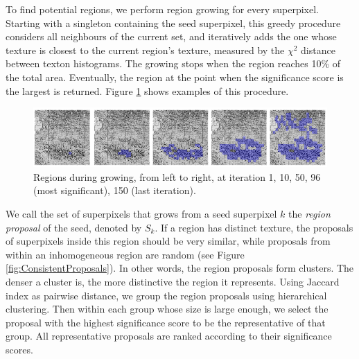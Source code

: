 \documentclass{llncs}
\begin{document}
To find potential regions, we perform region growing for every superpixel. Starting with a singleton containing the seed superpixel, this greedy procedure considers all neighbours of the current set, and iteratively adds the one whose texture is closest to the current region's texture, measured by the $\chi^2$ distance between texton histograms. The growing stops when the region reaches 10\% of the total area. Eventually, the region at the point when the significance score is the largest is returned. Figure \ref{fig:RegionGrowing} shows examples of this procedure.
\begin{figure}
	\includegraphics[width=\textwidth]{../figures/RegionGrowingPicsOnly.png}
	\caption{Regions during growing, from left to right, at iteration 1, 10, 50, 96 (most significant), 150 (last iteration).} %
	\label{fig:RegionGrowing}
\end{figure}


We call the set of superpixels that grows from a seed superpixel $k$ the \textit{region proposal} of the seed, denoted by $S_k$. If a region has distinct texture, the proposals of superpixels inside this region should be very similar, while proposals from within an inhomogeneous region are random (see Figure \ref{fig:ConsistentProposals}). In other words, the region proposals form clusters. The denser a cluster is, the more distinctive the region it represents. Using Jaccard index as pairwise distance, we group the region proposals using hierarchical clustering. Then within each group whose size is large enough, we select the proposal with the highest significance score to be the representative of that group. All representative proposals are ranked according to their significance scores. 
\end{document}
